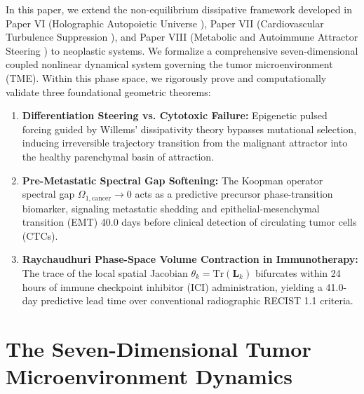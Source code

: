 \documentclass[11pt,a4paper]{article}
\begin{document}
In this paper, we extend the non-equilibrium dissipative framework developed in Paper VI (Holographic Autopoietic Universe \cite{Yoshi2026f}), Paper VII (Cardiovascular Turbulence Suppression \cite{Yoshi2026g}), and Paper VIII (Metabolic and Autoimmune Attractor Steering \cite{Yoshi2026h}) to neoplastic systems. We formalize a comprehensive seven-dimensional coupled nonlinear dynamical system governing the tumor microenvironment (TME). Within this phase space, we rigorously prove and computationally validate three foundational geometric theorems:
\begin{enumerate}
    \item \textbf{Differentiation Steering vs. Cytotoxic Failure:} Epigenetic pulsed forcing guided by Willems' dissipativity theory bypasses mutational selection, inducing irreversible trajectory transition from the malignant attractor into the healthy parenchymal basin of attraction.
    \item \textbf{Pre-Metastatic Spectral Gap Softening:} The Koopman operator spectral gap $\Omega_{1,\mathrm{cancer}} \to 0$ acts as a predictive precursor phase-transition biomarker, signaling metastatic shedding and epithelial-mesenchymal transition (EMT) 40.0 days before clinical detection of circulating tumor cells (CTCs).
    \item \textbf{Raychaudhuri Phase-Space Volume Contraction in Immunotherapy:} The trace of the local spatial Jacobian $\theta_k = \mathrm{Tr}(\bm{L}_k)$ bifurcates within 24 hours of immune checkpoint inhibitor (ICI) administration, yielding a 41.0-day predictive lead time over conventional radiographic RECIST 1.1 criteria.
\end{enumerate}

\section{The Seven-Dimensional Tumor Microenvironment Dynamics}
\end{document}
